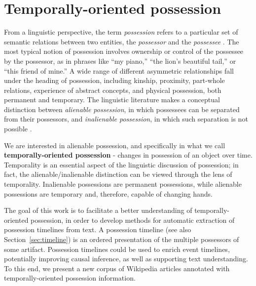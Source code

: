 \section{Temporally-oriented possession} \label{sec:intro}

From a linguistic perspective, the term \textit{possession} refers to a particular set of semantic relations between two entities, the \textit{possessor} and the \textit{possessee} \cite{stassen2009predicative}.
The most typical notion of possession involves ownership or control of the possessee by the possessor, as in phrases like ``my piano,'' ``the lion's beautiful tail,'' or ``this friend of mine.''
A wide range of different asymmetric relationships fall under the heading of possession, including kinship, proximity, part-whole relations, experience of abstract concepts, and physical possession, both permanent and temporary. 
The linguistic literature makes a conceptual distinction between \textit{alienable possession}, in which possessees can be separated from their possessors, and \textit{inalienable possession}, in which such separation is not possible \cite[among others]{aikhenvald2012possession,heine2006possession}.

We are interested in alienable possession, and specifically in what we call \textbf{temporally-oriented possession} - changes in possession of an object over time.
% 
% 
% 
%
Temporality is an essential aspect of the linguistic discussion  of possession; in fact, the alienable/inalienable distinction can be viewed through the lens of temporality. 
Inalienable possessions are permanent possessions, while alienable possessions are temporary and, therefore, capable of changing hands.



The goal of this work is to facilitate a better understanding of temporally-oriented possession, in order to develop methods for automatic extraction of possession timelines from text. 
A possession timeline (see also Section~\ref{sec:timeline}) is an ordered presentation of the multiple possessors of some artifact.
Possession timelines could be used to enrich event timelines, potentially improving causal inference, as well as supporting text understanding. 
To this end, we present a new corpus of Wikipedia articles annotated with temporally-oriented possession information.

